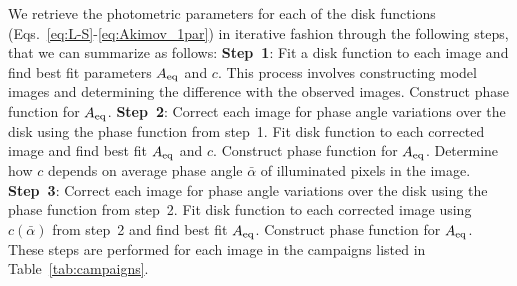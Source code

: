 \documentclass[3p,authoryear]{elsarticle}
\begin{document}
We retrieve the photometric parameters for each of the disk functions (Eqs.~\ref{eq:L-S}-\ref{eq:Akimov_1par}) in iterative fashion through the following steps, that we can summarize as follows: {\bf Step~1}: Fit a disk function to each image and find best fit parameters $A_{\rm eq}$ and $c$. This process involves constructing model images and determining the difference with the observed images. Construct phase function for $A_{\rm eq}$. {\bf Step~2}: Correct each image for phase angle variations over the disk using the phase function from step~1. Fit disk function to each corrected image and find best fit $A_{\rm eq}$ and $c$. Construct phase function for $A_{\rm eq}$. Determine how $c$ depends on average phase angle $\bar{\alpha}$ of illuminated pixels in the image. {\bf Step~3}: Correct each image for phase angle variations over the disk using the phase function from step~2. Fit disk function to each corrected image using $c(\bar{\alpha})$ from step~2 and find best fit $A_{\rm eq}$. Construct phase function for $A_{\rm eq}$. These steps are performed for each image in the campaigns listed in Table~\ref{tab:campaigns}.
\end{document}
